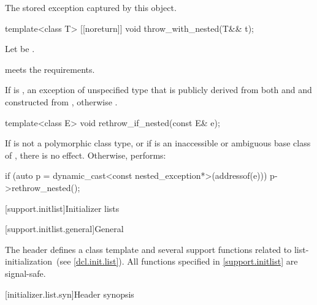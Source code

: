 \begin{itemdescr}
\pnum
\returns
The stored exception captured by this  object.
\end{itemdescr}

%
\begin{itemdecl}
template<class T> [[noreturn]] void throw_with_nested(T&& t);
\end{itemdecl}

\begin{itemdescr}
\pnum
Let  be .

\pnum
\expects
{} meets the  requirements.

\pnum
\throws
If 
is ,
an exception of unspecified type that is publicly derived from both
 and 
and constructed from , otherwise
.
\end{itemdescr}

%
\begin{itemdecl}
template<class E> void rethrow_if_nested(const E& e);
\end{itemdecl}

\begin{itemdescr}
\pnum
\effects
If  is not a polymorphic class type, or
if  is an inaccessible or ambiguous base class of ,
there is no effect.
Otherwise, performs:
\begin{codeblock}
if (auto p = dynamic_cast<const nested_exception*>(addressof(e)))
  p->rethrow_nested();
\end{codeblock}
\end{itemdescr}

[support.initlist]{Initializer lists}

[support.initlist.general]{General}

\pnum
The header  defines a class template and several
support functions related to list-initialization~(see \ref{dcl.init.list}).
%
All functions specified in \ref{support.initlist} are signal-safe.

[initializer.list.syn]{Header  synopsis}
%
%
%

